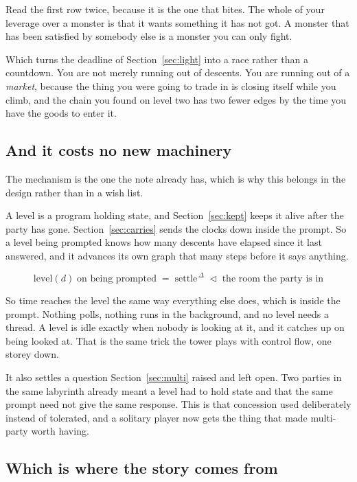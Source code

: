 \documentclass[11pt,a4paper]{article}
\begin{document}
Read the first row twice, because it is the one that bites. The whole of your leverage over a
monster is that it wants something it has not got. A monster that has been satisfied by somebody
else is a monster you can only fight.

\begin{alarmbox}
Which turns the deadline of Section~\ref{sec:light} into a race rather than a countdown. You are
not merely running out of descents. You are running out of a \emph{market}, because the thing you
were going to trade in is closing itself while you climb, and the chain you found on level two has
two fewer edges by the time you have the goods to enter it.
\end{alarmbox}

\subsection{And it costs no new machinery}

The mechanism is the one the note already has, which is why this belongs in the design rather than
in a wish list.

A level is a program holding state, and Section~\ref{sec:kept} keeps it alive after the party has
gone. Section~\ref{sec:carries} sends the clocks down inside the prompt. So a level being prompted
knows how many descents have elapsed since it last answered, and it advances its own graph that
many steps before it says anything.

\[ \text{level}(d) \;\text{on being prompted} \;=\; \text{settle}^{\,\Delta} \;\lhd\; \text{the room the party is in} \]

\begin{sectionbox}
So time reaches the level the same way everything else does, which is inside the prompt. Nothing
polls, nothing runs in the background, and no level needs a thread. A level is idle exactly when
nobody is looking at it, and it catches up on being looked at. That is the same trick the tower
plays with control flow, one storey down.
\end{sectionbox}

It also settles a question Section~\ref{sec:multi} raised and left open. Two parties in the same
labyrinth already meant a level had to hold state and that the same prompt need not give the same
response. This is that concession used deliberately instead of tolerated, and a solitary player now
gets the thing that made multi-party worth having.

\subsection{Which is where the story comes from}
\end{document}
